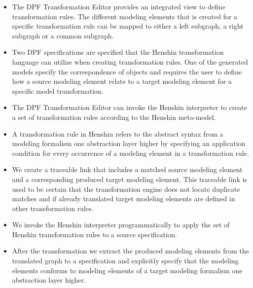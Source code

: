 \begin{itemize}
  	\item The DPF Transformation Editor provides an integrated view to define
	transformation rules. The different modeling elements that is created for a
	specific transformation rule can be mapped to either a left subgraph, a right
	subgraph or a common subgraph.
	
	\item Two DPF specifications are specified that the Henshin transformation language
	can utilize when creating transformation rules. One of the generated models
	specify the correspondence of objects and requires the user to define
	how a source modeling element relate to a target modeling element for a
	specific model transformation.
	
	\item The DPF Transformation Editor can invoke the Henshin interpreter to
	create a set of transformation rules according to the Henshin meta-model.
	
	\item A transformation rule in Henshin refers to the abstract syntax from
	a modeling formalism one abstraction layer higher by specifying an application
	condition for every occurrence of a modeling element in a transformation rule. 
	
	\item We create a traceable link that includes a matched source modeling
	element and a corresponding produced target modeling element. This traceable
	link is used to be certain that the transformation engine does not locate
	duplicate matches and if already translated target modeling elements are
	defined in other transformation rules.
	
	\item We invoke the Henshin interpreter programmatically to apply
	the set of Henshin transformation rules to a source specification.
	
	\item After the transformation we extract the produced modeling elements from
	the translated graph to a specification and explicitly specify that the
	modeling elements conforms to modeling elements of a target modeling formalism
	one abstraction layer higher.
   
\end{itemize}


